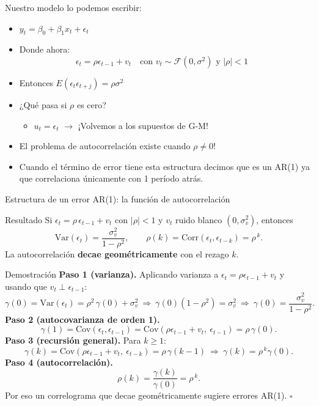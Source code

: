 \documentclass{beamer}
\begin{document}
\begin{frame}

Nuestro modelo lo podemos escribir:

\begin{itemize}
  \item \( y_t = \beta_0 + \beta_1 x_t + \epsilon_t \)
  \item Donde ahora:
  \[
  \epsilon_t = \rho \epsilon_{t-1} + v_t \quad \text{con } v_t \sim \mathcal{F}(0, \sigma^2) \text{ y } |\rho| < 1 \quad
  \]
  \item Entonces \( E(\epsilon_t \epsilon_{t+j}) = \rho \sigma^2 \)
  \item ¿Qué pasa si \(\rho\) es cero?
  \begin{itemize}
    \item \( u_t = \epsilon_t \) \(\rightarrow\) ¡Volvemos a los supuestos de G-M!
  \end{itemize}
  \item El problema de autocorrelación existe cuando \(\rho \neq 0\)!
  \item Cuando el término de error tiene esta estructura decimos que es un AR(1) ya que correlaciona únicamente con 1 período atrás.
\end{itemize}

\end{frame}

\begin{frame}[allowframebreaks]{Estructura de un error AR(1): la función de autocorrelación}

\begin{block}{Resultado}
Si $\epsilon_t=\rho\,\epsilon_{t-1}+v_t$ con $|\rho|<1$ y $v_t$ ruido blanco $(0,\sigma_v^2)$, entonces
\[
\text{Var}(\epsilon_t)=\frac{\sigma_v^2}{1-\rho^2},\qquad
\rho(k)=\text{Corr}(\epsilon_t,\epsilon_{t-k})=\rho^{\,k}.
\]
La autocorrelación \textbf{decae geométricamente} con el rezago $k$.
\end{block}

\pause

\begin{exampleblock}{Demostración}
\textbf{Paso 1 (varianza).} Aplicando varianza a $\epsilon_t=\rho\epsilon_{t-1}+v_t$ y usando que $v_t\perp\epsilon_{t-1}$:
\[
\gamma(0)=\text{Var}(\epsilon_t)=\rho^2\,\gamma(0)+\sigma_v^2 \ \Rightarrow\ \gamma(0)(1-\rho^2)=\sigma_v^2 \ \Rightarrow\ \gamma(0)=\frac{\sigma_v^2}{1-\rho^2}.
\]
\framebreak
\textbf{Paso 2 (autocovarianza de orden 1).}
\[
\gamma(1)=\text{Cov}(\epsilon_t,\epsilon_{t-1})=\text{Cov}(\rho\epsilon_{t-1}+v_t,\ \epsilon_{t-1})=\rho\,\gamma(0).
\]
\textbf{Paso 3 (recursión general).} Para $k\ge1$:
\[
\gamma(k)=\text{Cov}(\rho\epsilon_{t-1}+v_t,\ \epsilon_{t-k})=\rho\,\gamma(k-1)\ \Rightarrow\ \gamma(k)=\rho^{\,k}\gamma(0).
\]
\textbf{Paso 4 (autocorrelación).}
\[
\rho(k)=\frac{\gamma(k)}{\gamma(0)}=\rho^{\,k}.
\]
Por eso un correlograma que decae geométricamente sugiere errores AR(1). \hfill $\square$
\end{exampleblock}

\end{frame}
\end{document}
